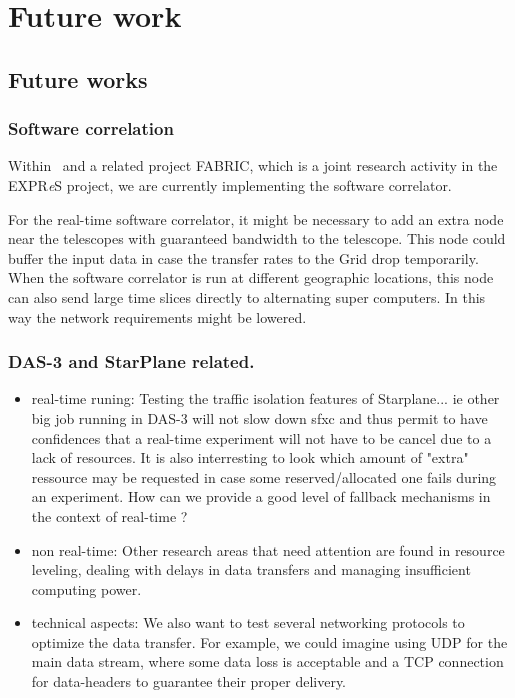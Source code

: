 \section{Future work}\label{sec:futurework}

\subsection{Future works}

\subsubsection{Software correlation}
Within \scarie\ and a related project FABRIC, which is a joint
research activity in the EXPR{\it e}S project, we are currently
implementing the software correlator.

For the real-time software correlator, it might be necessary to add an
extra node near the telescopes with guaranteed bandwidth to the
telescope. This node could buffer the input data in case the transfer
rates to the Grid drop temporarily. When the software correlator is
run at different geographic locations, this node can also send large
time slices directly to alternating super computers. In this way the
network requirements might be lowered.

\subsubsection{DAS-3 and StarPlane related.}
\begin{itemize}
\item real-time runing: Testing the traffic isolation features of
  Starplane... ie other big job running in DAS-3 will not slow down
  sfxc and thus permit to have confidences that a real-time experiment
  will not have to be cancel due to a lack of resources. It is also
  interresting to look which amount of "extra" ressource may be
  requested in case some reserved/allocated one fails during an
  experiment.  How can we provide a good level of fallback mechanisms
  in the context of real-time ?
\item non real-time: Other research areas that need attention are
  found in resource leveling, dealing with delays in data transfers
  and managing insufficient computing power.
\item technical aspects: We also want to test several networking
  protocols to optimize the data transfer. For example, we could
  imagine using UDP for the main data stream, where some data loss is
  acceptable and a TCP connection for data-headers to guarantee their
  proper delivery.
\end{itemize}



